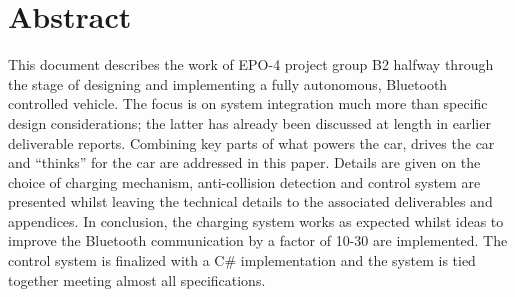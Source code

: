 \documentclass[11pt,titlepage]{report}
\begin{document}
\section*{Abstract}
This document describes the work of EPO-4 project group B2 halfway through the stage of designing and implementing a fully autonomous, Bluetooth controlled vehicle. The focus is on system integration much more than specific design considerations; the latter has already been discussed at length in earlier deliverable reports. Combining key parts of what powers the car, drives the car and ``thinks'' for the car are addressed in this paper. Details are given on the choice of charging mechanism, anti-collision detection and control system are presented whilst leaving the technical details to the associated deliverables and appendices. In conclusion, the charging system works as expected whilst ideas to improve the Bluetooth communication by a factor of 10-30 are implemented. The control system is finalized with a C\# implementation and the system is tied together meeting almost all specifications.
\end{document}
